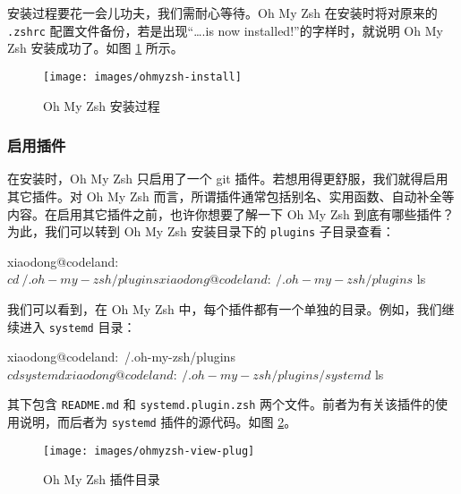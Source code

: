 \documentclass[]{ctexbook}
\newenvironment{Shaded}{\begin{snugshade}}{\end{snugshade}}
\newcommand{\ExtensionTok}[1]{#1}
\newcommand{\NormalTok}[1]{#1}
\begin{document}
安装过程要花一会儿功夫，我们需耐心等待。Oh My Zsh 在安装时将对原来的 \texttt{.zshrc} 配置文件备份，若是出现``\ldots{}.is now installed!''的字样时，就说明 Oh My Zsh 安装成功了。如图 \ref{fig:ohmyzsh-install} 所示。

\begin{figure}
\texttt{[image: images/ohmyzsh-install]} \caption{Oh My Zsh 安装过程}\label{fig:ohmyzsh-install}
\end{figure}

\hypertarget{ux542fux7528ux63d2ux4ef6}{%
\subsubsection{启用插件}\label{ux542fux7528ux63d2ux4ef6}}

在安装时，Oh My Zsh 只启用了一个 git 插件。若想用得更舒服，我们就得启用其它插件。对 Oh My Zsh 而言，所谓插件通常包括别名、实用函数、自动补全等内容。在启用其它插件之前，也许你想要了解一下 Oh My Zsh 到底有哪些插件？为此，我们可以转到 Oh My Zsh 安装目录下的 \texttt{plugins} 子目录查看：

\begin{Shaded}
\begin{Highlighting}[]
\ExtensionTok{xiaodong@codeland}\NormalTok{:~$ cd ~/.oh-my-zsh/plugins}
\ExtensionTok{xiaodong@codeland}\NormalTok{:~/.oh-my-zsh/plugins$ ls}
\end{Highlighting}
\end{Shaded}

我们可以看到，在 Oh My Zsh 中，每个插件都有一个单独的目录。例如，我们继续进入 \texttt{systemd} 目录：

\begin{Shaded}
\begin{Highlighting}[]
\ExtensionTok{xiaodong@codeland}\NormalTok{:~/.oh-my-zsh/plugins$ cd systemd}
\ExtensionTok{xiaodong@codeland}\NormalTok{:~/.oh-my-zsh/plugins/systemd$ ls}
\end{Highlighting}
\end{Shaded}

其下包含 \texttt{README.md} 和 \texttt{systemd.plugin.zsh} 两个文件。前者为有关该插件的使用说明，而后者为 \texttt{systemd} 插件的源代码。如图 \ref{fig:ohmyzsh-view-plug}。

\begin{figure}
\texttt{[image: images/ohmyzsh-view-plug]} \caption{Oh My Zsh 插件目录}\label{fig:ohmyzsh-view-plug}
\end{figure}
\end{document}
